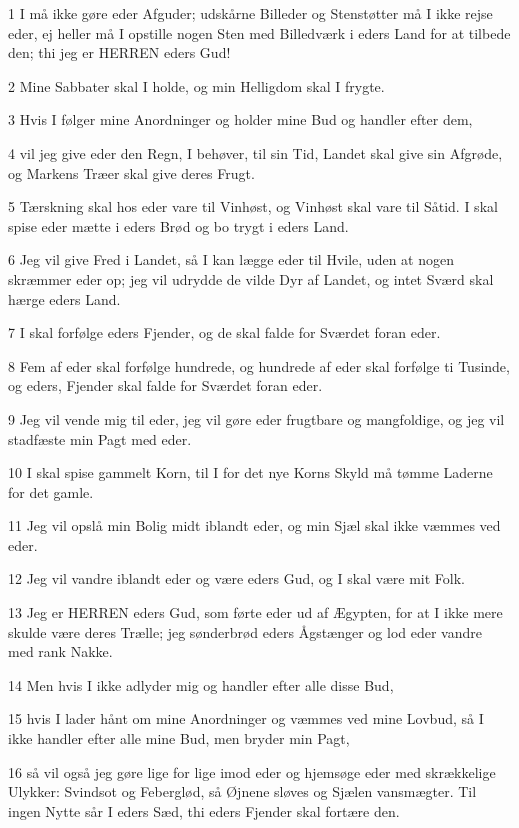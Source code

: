 \par 1 I må ikke gøre eder Afguder; udskårne Billeder og Stenstøtter må I ikke rejse eder, ej heller må I opstille nogen Sten med Billedværk i eders Land for at tilbede den; thi jeg er HERREN eders Gud!
\par 2 Mine Sabbater skal I holde, og min Helligdom skal I frygte.
\par 3 Hvis I følger mine Anordninger og holder mine Bud og handler efter dem,
\par 4 vil jeg give eder den Regn, I behøver, til sin Tid, Landet skal give sin Afgrøde, og Markens Træer skal give deres Frugt.
\par 5 Tærskning skal hos eder vare til Vinhøst, og Vinhøst skal vare til Såtid. I skal spise eder mætte i eders Brød og bo trygt i eders Land.
\par 6 Jeg vil give Fred i Landet, så I kan lægge eder til Hvile, uden at nogen skræmmer eder op; jeg vil udrydde de vilde Dyr af Landet, og intet Sværd skal hærge eders Land.
\par 7 I skal forfølge eders Fjender, og de skal falde for Sværdet foran eder.
\par 8 Fem af eder skal forfølge hundrede, og hundrede af eder skal forfølge ti Tusinde, og eders, Fjender skal falde for Sværdet foran eder.
\par 9 Jeg vil vende mig til eder, jeg vil gøre eder frugtbare og mangfoldige, og jeg vil stadfæste min Pagt med eder.
\par 10 I skal spise gammelt Korn, til I for det nye Korns Skyld må tømme Laderne for det gamle.
\par 11 Jeg vil opslå min Bolig midt iblandt eder, og min Sjæl skal ikke væmmes ved eder.
\par 12 Jeg vil vandre iblandt eder og være eders Gud, og I skal være mit Folk.
\par 13 Jeg er HERREN eders Gud, som førte eder ud af Ægypten, for at I ikke mere skulde være deres Trælle; jeg sønderbrød eders Ågstænger og lod eder vandre med rank Nakke.
\par 14 Men hvis I ikke adlyder mig og handler efter alle disse Bud,
\par 15 hvis I lader hånt om mine Anordninger og væmmes ved mine Lovbud, så I ikke handler efter alle mine Bud, men bryder min Pagt,
\par 16 så vil også jeg gøre lige for lige imod eder og hjemsøge eder med skrækkelige Ulykker: Svindsot og Feberglød, så Øjnene sløves og Sjælen vansmægter. Til ingen Nytte sår I eders Sæd, thi eders Fjender skal fortære den.
